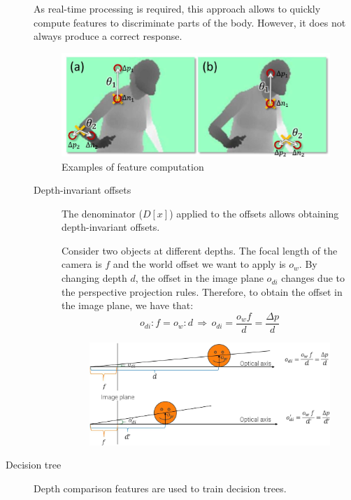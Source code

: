 \begin{description}
        \begin{remark}
            As real-time processing is required, this approach allows to quickly compute features to discriminate parts of the body. However, it does not always produce a correct response.
        \end{remark}

        \begin{figure}[H]
            \centering
            \includegraphics[width=0.6\linewidth]{./img/_depth_comparison_features.jpg}
            \caption{Examples of feature computation}
        \end{figure}

        \begin{description}
            \item[Depth-invariant offsets]
                The denominator ($D[x]$) applied to the offsets allows obtaining depth-invariant offsets.

                Consider two objects at different depths. The focal length of the camera is $f$ and the world offset we want to apply is $o_w$. By changing depth $d$, the offset in the image plane $o_{di}$ changes due to the perspective projection rules. Therefore, to obtain the offset in the image plane, we have that:
                \[ o_{di} : f = o_w : d \,\Rightarrow\, o_{di} = \frac{o_w f}{d} = \frac{\Delta p}{d} \]

                \begin{figure}[H]
                    \centering
                    \includegraphics[width=0.6\linewidth]{./img/_depth_invariant_offset.jpg}
                \end{figure}
        \end{description}

    \item[Decision tree] 
        Depth comparison features are used to train decision trees.


\end{description}
